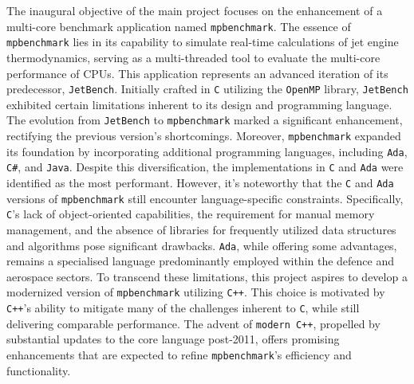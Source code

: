 \documentclass[12pt, openany]{book}
\begin{document}
The inaugural objective of the main project focuses on the enhancement of a multi-core benchmark application named \texttt{mpbenchmark}\cite{mpbenchmark_paper}. The essence of \texttt{mpbenchmark} lies in its capability to simulate real-time calculations of jet engine thermodynamics, serving as a multi-threaded tool to evaluate the multi-core performance of CPUs. This application represents an advanced iteration of its predecessor, \texttt{JetBench}\cite{JetBench_paper}. Initially crafted in \texttt{C} utilizing the \texttt{OpenMP} library, \texttt{JetBench} exhibited certain limitations inherent to its design and programming language. The evolution from \texttt{JetBench} to \texttt{mpbenchmark} marked a significant enhancement, rectifying the previous version's shortcomings. Moreover, \texttt{mpbenchmark} expanded its foundation by incorporating additional programming languages, including \texttt{Ada}, \texttt{C\#}, and \texttt{Java}. Despite this diversification, the implementations in \texttt{C} and \texttt{Ada} were identified as the most performant. However, it's noteworthy that the \texttt{C} and \texttt{Ada} versions of \texttt{mpbenchmark} still encounter language-specific constraints. Specifically, \texttt{C}'s lack of object-oriented capabilities, the requirement for manual memory management, and the absence of libraries for frequently utilized data structures and algorithms pose significant drawbacks\cite{c_language_drawbacks}. \texttt{Ada}, while offering some advantages, remains a specialised language predominantly employed within the defence and aerospace sectors\cite{ada_langauge_uses}. To transcend these limitations, this project aspires to develop a modernized version of \texttt{mpbenchmark} utilizing \texttt{C++}. This choice is motivated by \texttt{C++}'s ability to mitigate many of the challenges inherent to \texttt{C}, while still delivering comparable performance. The advent of \texttt{modern C++}, propelled by substantial updates to the core language post-2011, offers promising enhancements that are expected to refine \texttt{mpbenchmark}'s efficiency and functionality.
\end{document}
